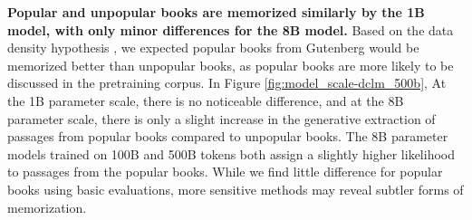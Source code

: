 \documentclass{article} %
\begin{document}
\textbf{Popular and unpopular books are memorized similarly by the 1B model, with only minor differences for the 8B model.} Based on the data density hypothesis \citep{kirchenbauer2024lmd}, we expected popular books from Gutenberg would be memorized better than unpopular books, as popular books are more likely to be discussed in the pretraining corpus. In Figure \ref{fig:model_scale-dclm_500b}, At the 1B parameter scale, there is no noticeable difference, and at the 8B parameter scale, there is only a slight increase in the generative extraction of passages from popular books compared to unpopular books. The 8B parameter models trained on 100B and 500B tokens both assign a slightly higher likelihood to passages from the popular books. While we find little difference for popular books using basic evaluations, more sensitive methods may reveal subtler forms of memorization.


\newcommand{\slotlabel}[1]{\colorbox{gray!20}{\texttt{#1}}}
\newcommand{\slot}{\colorbox{slotgray}{\texttt{<candidate>}}}
\newcommand{\attr}[1]{\colorbox{attrpurple}{\texttt{#1}}}
\end{document}
